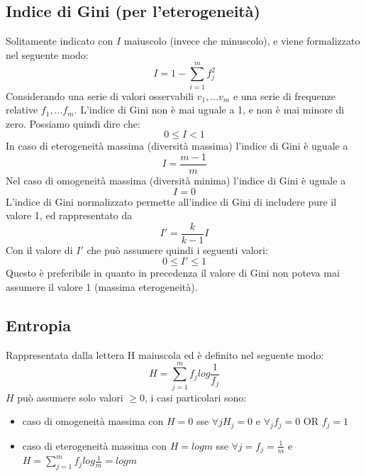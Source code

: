 \subsection{Indice di Gini (per l'eterogeneità)}
Solitamente indicato con $I$ maiuscolo (invece che minuscolo), e viene formalizzato nel seguente modo:
\begin{equation*}
I = 1 - \sum_{i=1}^m f_j^2
\end{equation*}
Considerando una serie di valori osservabili $v_1, ... v_m$ e una serie di frequenze relative $f_1, ... f_m$.
L'indice di Gini non è mai uguale a 1, e non è mai minore di zero. Possiamo quindi dire che:
\begin{equation*}
0 \leq I < 1
\end{equation*}
In caso di eterogeneità massima (diversità massima) l'indice di Gini è uguale a \begin{equation*}
I = \frac{m-1}{m}
\end{equation*}
Nel caso di omogeneità massima (diversità minima) l'indice di Gini è uguale a 
\begin{equation*}
I = 0
\end{equation*}
L'indice di Gini normalizzato permette all'indice di Gini di includere pure il valore 1, ed rappresentato da
\begin{equation*}
I' = \frac{k}{k-1}I
\end{equation*}
Con il valore di $I'$ che può assumere quindi i seguenti valori:
\begin{equation*}
0 \leq I' \leq 1
\end{equation*}
Questo è preferibile in quanto in precedenza il valore di Gini non poteva mai assumere il valore 1 (massima eterogeneità).

\subsection{Entropia}
Rappresentata dalla lettera H maiuscola ed è definito nel seguente modo:
\begin{equation*}
H = \sum_{j=1}^m f_jlog\frac{1}{f_j}
\end{equation*}
$H$ può assumere solo valori $\geq 0 $, i casi particolari sono:
\begin{itemize}
\item caso di omogeneità massima con $H = 0$ sse $\forall j H_j = 0$ e $\forall_j f_j = 0$ OR $f_j = 1$ 
\item caso di eterogeneità massima con $H = log m $ sse $ \forall j = f_j = \frac{1}{m}$ e $H = \sum_{j=1}^m f_jlog\frac{1}{m} = log m$
\end{itemize}

